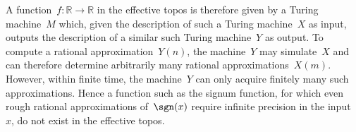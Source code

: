 \documentclass[oneside]{amsart}
\theoremstyle{definition}
\theoremstyle{plain}
\theoremstyle{remark}
\newcommand{\RR}{\mathbb{R}}
\renewcommand{\_}{\mathpunct{.}\,}
\newcommand{\effective}{ef{}fective\xspace}
\newcommand{\?}{\,{:}\,}
\begin{document}
A function~$f : \RR \to \RR$ in the \effective topos is therefore given by a
Turing machine~$M$ which, given the description of such a Turing machine~$X$ as
input, outputs the description of a similar such Turing machine~$Y$ as output.
To compute a rational approximation~$Y(n)$, the machine~$Y$ may simulate~$X$
and can therefore determine arbitrarily many rational approximations~$X(m)$.
However, within finite time, the machine~$Y$ can only acquire finitely many
such approximations. Hence a function such as the signum function, for which
even rough rational approximations of~$\sgn(x)$ require infinite precision in
the input~$x$, do not exist in the \effective topos.



\printbibliography
\end{document}
